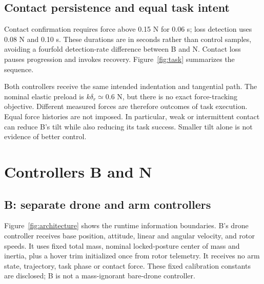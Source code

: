 \documentclass[conference]{IEEEtran}
\begin{document}
\subsection{Contact persistence and equal task intent}
Contact confirmation requires force above 0.15 N for 0.06 s; loss detection uses 0.08 N and 0.10 s. These durations are in seconds rather than control samples, avoiding a fourfold detection-rate difference between B and N. Contact loss pauses progression and invokes recovery. Figure~\ref{fig:task} summarizes the sequence.

Both controllers receive the same intended indentation and tangential path. The nominal elastic preload is $k\delta_r\simeq0.6$ N, but there is no exact force-tracking objective. Different measured forces are therefore outcomes of task execution. Equal force histories are not imposed. In particular, weak or intermittent contact can reduce B's tilt while also reducing its task success. Smaller tilt alone is not evidence of better control.

\section{Controllers B and N}
\subsection{B: separate drone and arm controllers}
Figure~\ref{fig:architecture} shows the runtime information boundaries. B's drone controller receives base position, attitude, linear and angular velocity, and rotor speeds. It uses fixed total mass, nominal locked-posture center of mass and inertia, plus a hover trim initialized once from rotor telemetry. It receives no arm state, trajectory, task phase or contact force. These fixed calibration constants are disclosed; B is not a mass-ignorant bare-drone controller.
\end{document}
